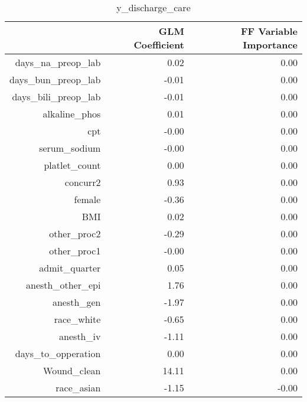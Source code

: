\begin{table}[ht]
\centering
\begin{tabular}{rrr}
  \hline
 & GLM Coefficient & FF Variable Importance \\ 
  \hline
days\_na\_preop\_lab & 0.02 & 0.00 \\ 
  days\_bun\_preop\_lab & -0.01 & 0.00 \\ 
  days\_bili\_preop\_lab & -0.01 & 0.00 \\ 
  alkaline\_phos & 0.01 & 0.00 \\ 
  cpt & -0.00 & 0.00 \\ 
  serum\_sodium & -0.00 & 0.00 \\ 
  platlet\_count & 0.00 & 0.00 \\ 
  concurr2 & 0.93 & 0.00 \\ 
  female & -0.36 & 0.00 \\ 
  BMI & 0.02 & 0.00 \\ 
  other\_proc2 & -0.29 & 0.00 \\ 
  other\_proc1 & -0.00 & 0.00 \\ 
  admit\_quarter & 0.05 & 0.00 \\ 
  anesth\_other\_epi & 1.76 & 0.00 \\ 
  anesth\_gen & -1.97 & 0.00 \\ 
  race\_white & -0.65 & 0.00 \\ 
  anesth\_iv & -1.11 & 0.00 \\ 
  days\_to\_opperation & 0.00 & 0.00 \\ 
  Wound\_clean & 14.11 & 0.00 \\ 
  race\_asian & -1.15 & -0.00 \\ 
   \hline
\end{tabular}
\caption{y_discharge_care} 
\end{table}

